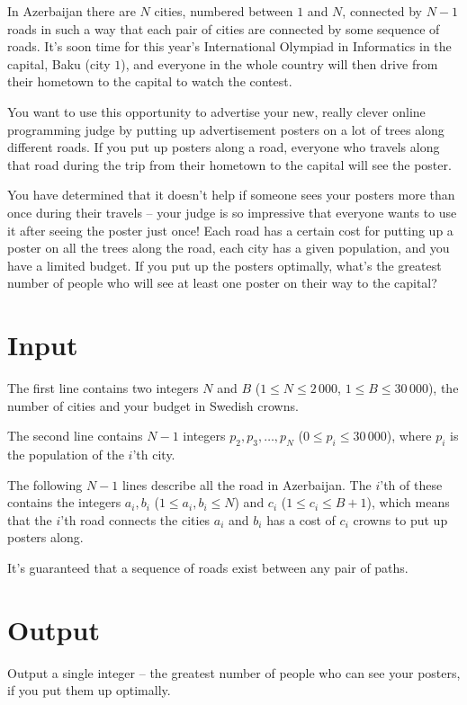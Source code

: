 \noindent
In Azerbaijan there are $N$ cities, numbered between $1$ and $N$, connected by $N - 1$ roads in such a way
that each pair of cities are connected by some sequence of roads.
It's soon time for this year's International Olympiad in Informatics in the capital, Baku (city $1$),
and everyone in the whole country will then drive from their hometown to the capital to watch the contest.

You want to use this opportunity to advertise your new, really clever online programming judge by putting up
advertisement posters on a lot of trees along different roads.
If you put up posters along a road, everyone who travels along that road during the trip from their hometown to the
capital will see the poster.

You have determined that it doesn't help if someone sees your posters more than once during their travels
-- your judge is so impressive that everyone wants to use it after seeing the poster just once!
Each road has a certain cost for putting up a poster on all the trees along the road, each city has a given
population, and you have a limited budget. If you put up the posters optimally, what's the greatest number of
people who will see at least one poster on their way to the capital?

\section*{Input}
The first line contains two integers $N$ and $B$ ($1 \le N \le 2\,000$, $1 \le B \le 30\,000$), the number of cities and your budget in Swedish crowns.

The second line contains $N-1$ integers $p_2, p_3, \dots, p_N$ ($0 \le p_i \le 30\,000$), where
$p_i$ is the population of the $i$'th city.

The following $N-1$ lines describe all the road in Azerbaijan.
The $i$'th of these contains the integers $a_i, b_i$ ($1 \le a_i, b_i \le N$) and $c_i$ ($1 \le c_i \le B+1$), which
means that the $i$'th road connects the cities $a_i$ and $b_i$ has a cost of $c_i$ crowns to put up posters along.

It's guaranteed that a sequence of roads exist between any pair of paths.

\section*{Output}
Output a single integer -- the greatest number of people who can see your posters, if you put them up optimally.


